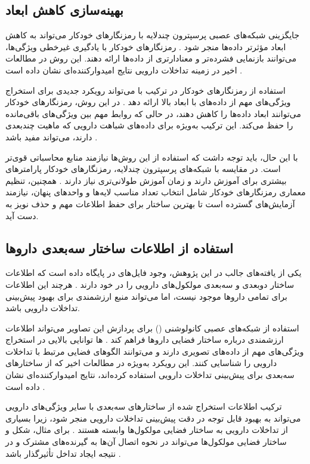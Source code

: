 \subsection{بهینه‌سازی کاهش ابعاد}
جایگزینی شبکه‌های عصبی پرسپترون چندلایه با رمزنگارهای خودکار می‌تواند به کاهش ابعاد مؤثرتر داده‌ها منجر شود \cite{ref_he2023}. رمزنگارهای خودکار با یادگیری غیرخطی ویژگی‌ها، می‌توانند بازنمایی فشرده‌تر و معنادارتری از داده‌ها ارائه دهند. این روش در مطالعات اخیر در زمینه تداخلات دارویی نتایج امیدوارکننده‌ای نشان داده است \cite{ref_dai2020}. 

استفاده از رمزنگارهای خودکار در ترکیب با  می‌تواند رویکرد جدیدی برای استخراج ویژگی‌های مهم از داده‌های با ابعاد بالا ارائه دهد \cite{ref_shi2024}. در این روش، رمزنگارهای خودکار می‌توانند ابعاد داده‌ها را کاهش دهند، در حالی که  روابط مهم بین ویژگی‌های باقی‌مانده را حفظ می‌کند. این ترکیب به‌ویژه برای داده‌های شباهت دارویی که ماهیت چندبعدی دارند، می‌تواند مفید باشد \cite{ref_deng2020}.

با این حال، باید توجه داشت که استفاده از این روش‌ها نیازمند منابع محاسباتی قوی‌تر است. در مقایسه با شبکه‌های پرسپترون چندلایه، رمزنگارهای خودکار پارامترهای بیشتری برای آموزش دارند و زمان آموزش طولانی‌تری نیاز دارند \cite{ref_dai2020}. همچنین، تنظیم معماری رمزنگارهای خودکار شامل انتخاب تعداد مناسب لایه‌ها و واحدهای پنهان، نیازمند آزمایش‌های گسترده است تا بهترین ساختار برای حفظ اطلاعات مهم و حذف نویز به دست آید.

\subsection{استفاده از اطلاعات ساختار سه‌بعدی داروها}
یکی از یافته‌های جالب در این پژوهش، وجود فایل‌های  در پایگاه داده  است که اطلاعات ساختار دو‌بعدی و سه‌بعدی مولکول‌های دارویی را در خود دارند \cite{ref_drugbank}. هرچند این اطلاعات برای تمامی داروها موجود نیست، اما می‌تواند منبع ارزشمندی برای بهبود پیش‌بینی تداخلات دارویی باشد.

استفاده از شبکه‌های عصبی کانولوشنی () برای پردازش این تصاویر می‌تواند اطلاعات ارزشمندی درباره ساختار فضایی داروها فراهم کند \cite{ref_asfand2024}. ها توانایی بالایی در استخراج ویژگی‌های مهم از داده‌های تصویری دارند و می‌توانند الگوهای فضایی مرتبط با تداخلات دارویی را شناسایی کنند. این رویکرد به‌ویژه در مطالعات اخیر که از ساختارهای سه‌بعدی برای پیش‌بینی تداخلات دارویی استفاده کرده‌اند، نتایج امیدوارکننده‌ای نشان داده است \cite{ref_he2023}.

ترکیب اطلاعات استخراج شده از ساختارهای سه‌بعدی با سایر ویژگی‌های دارویی می‌تواند به بهبود قابل توجه در دقت پیش‌بینی تداخلات دارویی منجر شود، زیرا بسیاری از تداخلات دارویی به ساختار فضایی مولکول‌ها وابسته هستند \cite{ref_yang2022}. برای مثال، شکل و ساختار فضایی مولکول‌ها می‌تواند در نحوه اتصال آن‌ها به گیرنده‌های مشترک و در نتیجه ایجاد تداخل تأثیرگذار باشد \cite{ref_weininger1988}.

